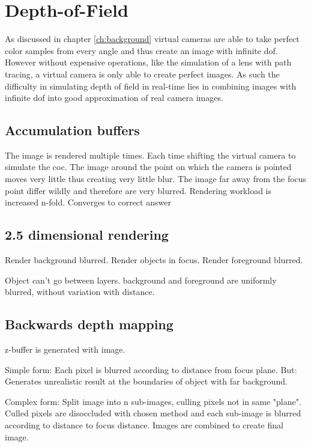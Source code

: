\chapter{Depth-of-Field}
As discussed in chapter \ref{ch:background} virtual cameras are able to take perfect color samples from every angle and thus create an image with infinite \gls{dof}.
However without expensive operations, like the simulation of a lens with path tracing, a virtual camera is only able to create perfect images.
As such the difficulty in simulating depth of field in real-time lies in combining images with infinite \gls{dof} into good approximation of real camera images.
\section{Accumulation buffers}
The image is rendered multiple times.
Each time shifting the virtual camera to simulate the \gls{coc}.
The image around the point on which the camera is pointed moves very little thus creating very little blur.
The image far away from the focus point differ wildly and therefore are very blurred.
Rendering workload is increased n-fold. Converges to correct answer

\section{2.5 dimensional rendering}
Render background blurred.
Render objects in focus.
Render foreground blurred.

Object can't go between layers.
background and foreground are uniformly blurred, without variation with distance.

\section{Backwards depth mapping}
z-buffer is generated with image.

Simple form: Each pixel is blurred according to distance from focus plane.
But: Generates unrealistic result at the boundaries of object with far background.

Complex form: Split image into n sub-images, culling pixels not in same "plane".
Culled pixels are disoccluded with chosen method and each sub-image is blurred according to distance to focus distance.
Images are combined to create final image.

